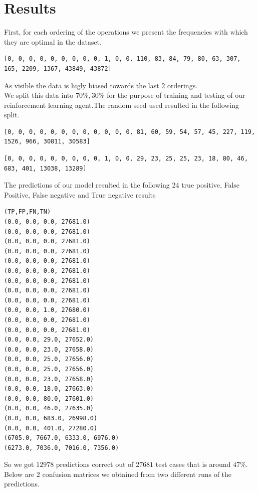 \section{Results}
First, for each ordering of the operations we present the frequencies with which they are optimal in the dataset.
\begin{lstlisting}[caption=Frequencies of optimal moves in total data]
[0, 0, 0, 0, 0, 0, 0, 0, 0, 1, 0, 0, 110, 83, 84, 79, 80, 63, 307, 165, 2209, 1367, 43849, 43872]
\end{lstlisting} 
As visible the data is higly biased towards the last $2$ orderings.\\
We split this data into $70\%,30\%$ for the purpose of training and testing of our reinforcement learning agent.The random seed used resulted in the following split.
\begin{lstlisting}[caption= Frequencies of optimal move in training data]
[0, 0, 0, 0, 0, 0, 0, 0, 0, 0, 0, 0, 81, 60, 59, 54, 57, 45, 227, 119, 1526, 966, 30811, 30583]
\end{lstlisting}
\begin{lstlisting}[caption= Frequencies of optimal move in testing data]
[0, 0, 0, 0, 0, 0, 0, 0, 0, 1, 0, 0, 29, 23, 25, 25, 23, 18, 80, 46, 683, 401, 13038, 13289]
\end{lstlisting}
The predictions of our model resulted in the following $24$ true positive, False Positive, False negative and True negative results\\
\begin{lstlisting}[caption= True positives False positives False negatives True negatives]
(TP,FP,FN,TN)
(0.0, 0.0, 0.0, 27681.0)
(0.0, 0.0, 0.0, 27681.0)
(0.0, 0.0, 0.0, 27681.0)
(0.0, 0.0, 0.0, 27681.0)
(0.0, 0.0, 0.0, 27681.0)
(0.0, 0.0, 0.0, 27681.0)
(0.0, 0.0, 0.0, 27681.0)
(0.0, 0.0, 0.0, 27681.0)
(0.0, 0.0, 0.0, 27681.0)
(0.0, 0.0, 1.0, 27680.0)
(0.0, 0.0, 0.0, 27681.0)
(0.0, 0.0, 0.0, 27681.0)
(0.0, 0.0, 29.0, 27652.0)
(0.0, 0.0, 23.0, 27658.0)
(0.0, 0.0, 25.0, 27656.0)
(0.0, 0.0, 25.0, 27656.0)
(0.0, 0.0, 23.0, 27658.0)
(0.0, 0.0, 18.0, 27663.0)
(0.0, 0.0, 80.0, 27601.0)
(0.0, 0.0, 46.0, 27635.0)
(0.0, 0.0, 683.0, 26998.0)
(0.0, 0.0, 401.0, 27280.0)
(6705.0, 7667.0, 6333.0, 6976.0)
(6273.0, 7036.0, 7016.0, 7356.0)
\end{lstlisting}
So we got $12978$ predictions correct out of $27681$ test cases that is around $47\%$.
Below are 2 confusion matrices we obtained from two different runs of the predictions.\\

